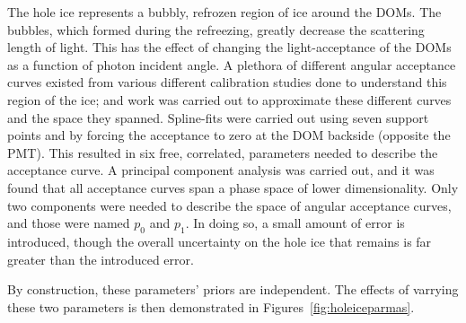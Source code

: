\documentclass[main.tex]{subfiles}
\begin{document}
The hole ice represents a bubbly, refrozen region of ice around the DOMs. 
The bubbles, which formed during the refreezing, greatly decrease the scattering length of light. 
This has the effect of changing the light-acceptance of the DOMs as a function of photon incident angle. 
A plethora of different angular acceptance curves existed from various different calibration studies done to understand this region of the ice; and work was carried out to approximate these different curves and the space they spanned. 
Spline-fits were carried out using seven support points and by forcing the acceptance to zero at the DOM backside (opposite the PMT). 
This resulted in six free, correlated, parameters needed to describe the acceptance curve. 
A principal component analysis was carried out, and it was found that all acceptance curves span a phase space of lower dimensionality. 
Only two components were needed to describe the space of angular acceptance curves, and those were named $p_{0}$ and $p_{1}$.
In doing so, a small amount of error is introduced, though the overall uncertainty on the hole ice that remains is far greater than the introduced error. 

By construction, these parameters' priors are independent.
The effects of varrying these two parameters is then demonstrated in Figures~\ref{fig:holeiceparmas}.
\end{document}
